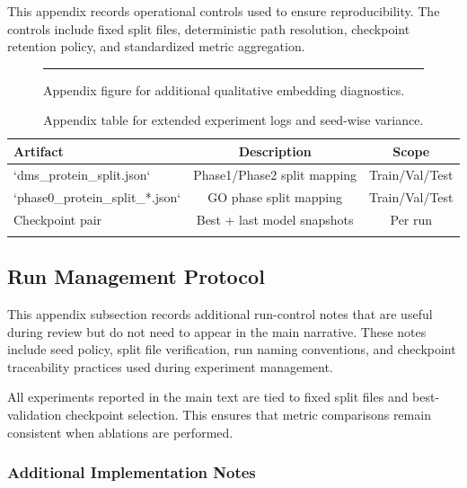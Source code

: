 \documentclass[unnumsec,webpdf,contemporary,large]{oup-authoring-template}%
\theoremstyle{thmstyleone}%
\theoremstyle{thmstyletwo}%
\theoremstyle{thmstylethree}%
\begin{document}
\begin{appendices}
This appendix records operational controls used to ensure reproducibility. The controls include fixed split files, deterministic path resolution, checkpoint retention policy, and standardized metric aggregation.

\begin{figure}[b]
\centering
{\color{black!20}\rule{217pt}{120pt}}
\caption{Appendix figure for additional qualitative embedding diagnostics.\label{fig4}}
\end{figure}

\begin{table}[t]%
\begin{center}
\begin{minipage}{.52\columnwidth}
\caption{Appendix table for extended experiment logs and seed-wise variance.\label{tab4}}%
\begin{tabular}{@{\extracolsep\fill}lcc@{}}%
\toprule
Artifact & Description & Scope \\
\midrule
`dms_protein_split.json` & Phase1/Phase2 split mapping & Train/Val/Test \\
`phase0_protein_split_*.json` & GO phase split mapping & Train/Val/Test \\
Checkpoint pair & Best + last model snapshots & Per run \\
\botrule
\end{tabular}
\end{minipage}
\end{center}
\end{table}

\subsection{Run Management Protocol}\label{subsec5}

This appendix subsection records additional run-control notes that are useful during review but do not need to appear in the main narrative. These notes include seed policy, split file verification, run naming conventions, and checkpoint traceability practices used during experiment management.

All experiments reported in the main text are tied to fixed split files and best-validation checkpoint selection. This ensures that metric comparisons remain consistent when ablations are performed.

\subsubsection{Additional Implementation Notes}\label{subsubsec4}


\end{appendices}
\end{document}
